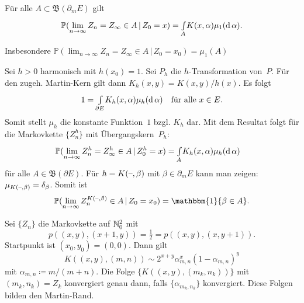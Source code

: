 \documentclass{cheat-sheet}
\renewcommand{\P}{\mathbb{P}} %
\newcommand{\ind}{\mathbbm{1}} %
\newcommand{\Bor}{\mathfrak{B}} %
\begin{document}
\begin{resultat}
  Für alle $A \subset \Bor(\partial_m E)$ gilt
  \[
    \P(\lim_{n \to \infty} Z_n = Z_\infty \in A \,|\, Z_0 = x) =
    \myint{A}{} K(x, \alpha) \mu_1(\d\,\alpha).
  \]
\end{resultat}

\begin{bem}
  Insbesondere $\P(\lim_{n \to \infty} Z_n = Z_\infty \in A \,|\, Z_0 = x_0) = \mu_1(A)$
\end{bem}

\begin{bem}
  Sei $h > 0$ harmonisch mit $h(x_0) = 1$.
  Sei $P_h$ die $h$-Transformation von~$P$.
  Für den zugeh. Martin-Kern gilt dann $K_h(x, y) = K(x, y) / h(x)$.
  Es folgt
  \[
    1 = {\textstyle \int\limits_{\partial E}^{}} K_h(x, \alpha) \mu_h(\mathrm{d}\,\alpha) \quad
    \text{für alle } x \in E.
  \]
  Somit stellt $\mu_h$ die konstante Funktion~$1$ bzgl. $K_h$ dar.
  Mit dem Resultat folgt für die Markovkette $\{ Z_n^h \}$ mit Übergangskern~$P_h$:
  \[
    \P(\lim_{n \to \infty} Z_n^h = Z_\infty^h \in A \,|\, Z_0^h = x) = \myint{A}{} K_h(x, \alpha) \mu_h(\d\,\alpha) \quad
  \]
  für alle $A \in \Bor(\partial E)$.
  Für $h = K(\text{--}, \beta)$ mit $\beta \in \partial_m E$ kann man zeigen: $\mu_{K(\text{--}, \beta)} = \delta_\beta$.
  Somit ist
  \[
    \P(\lim_{n \to \infty} Z_n^{K(\blank, \beta)} \in A \,|\, Z_0 = x_0) = \ind \{ \beta \in A \}.
  \]
\end{bem}

\begin{bsp}
  Sei $\{ Z_n \}$ die Markovkette auf $\mathbb{N}_0^2$ mit
  \[
    p((x, y), (x+1, y)) = \tfrac{1}{2} = p((x, y), (x, y+1)).
  \]
  Startpunkt ist $(x_0, y_0) = (0, 0)$.
  Dann gilt
  \[
    K((x, y), (m, n)) \sim
    2^{x+y} \alpha_{m,n}^x (1-\alpha_{m,n})^y
  \]
  mit $\alpha_{m,n} \coloneqq m / (m+n)$.
  Die Folge $\{ K((x, y), (m_k, n_k)) \}$ mit $(m_k, n_k) = Z_k$ konvergiert genau dann, falls $\{ \alpha_{m_k,n_k} \}$ konvergiert.
  Diese Folgen bilden den Martin-Rand.
\end{bsp}
\end{document}
